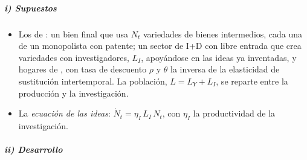\documentclass[11pt]{article}
\begin{document}
\subparagraph{i) Supuestos}

\begin{itemize}
\item Los de : un bien final que usa $N_t$ variedades de bienes intermedios, cada una de un monopolista con patente; un sector de I+D con libre entrada que crea variedades con investigadores, $L_I$, apoyándose en las ideas ya inventadas, y hogares de , con tasa de descuento $\rho$ y $\theta$ la inversa de la elasticidad de sustitución intertemporal. La población, $L=L_Y+L_I$, se reparte entre la producción y la investigación.
\item La \emph{ecuación de las ideas}: $\dot N_t=\eta_I\,L_I\,N_t$, con $\eta_I$ la productividad de la investigación.
\end{itemize}

\subparagraph{ii) Desarrollo}
\end{document}
